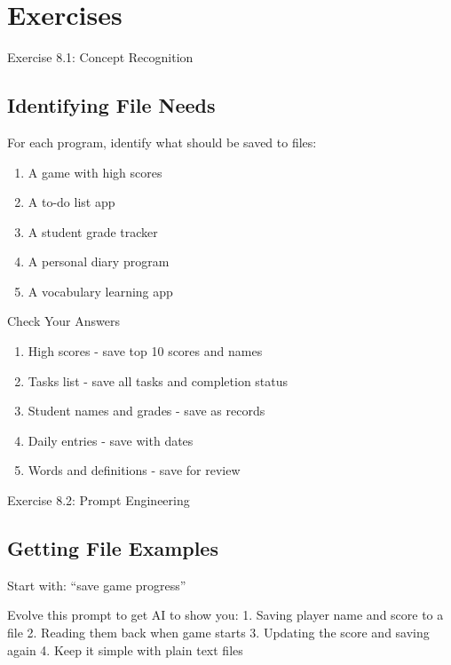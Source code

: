 \documentclass[
  letterpaper,
  DIV=11,
  numbers=noendperiod,
  oneside]{scrreprt}
\providecommand{\tightlist}{%
  \setlength{\itemsep}{0pt}\setlength{\parskip}{0pt}}\usepackage{longtable,booktabs,array}
\begin{document}
\section{Exercises}\label{exercises-8}

Exercise 8.1: Concept Recognition

\subsection{Identifying File Needs}\label{identifying-file-needs}

For each program, identify what should be saved to files:

\begin{enumerate}
\def\labelenumi{\arabic{enumi}.}
\tightlist
\item
  A game with high scores
\item
  A to-do list app
\item
  A student grade tracker
\item
  A personal diary program
\item
  A vocabulary learning app
\end{enumerate}

Check Your Answers

\begin{enumerate}
\def\labelenumi{\arabic{enumi}.}
\tightlist
\item
  High scores - save top 10 scores and names
\item
  Tasks list - save all tasks and completion status
\item
  Student names and grades - save as records
\item
  Daily entries - save with dates
\item
  Words and definitions - save for review
\end{enumerate}

Exercise 8.2: Prompt Engineering

\subsection{Getting File Examples}\label{getting-file-examples}

Start with: ``save game progress''

Evolve this prompt to get AI to show you: 1. Saving player name and
score to a file 2. Reading them back when game starts 3. Updating the
score and saving again 4. Keep it simple with plain text files
\end{document}
